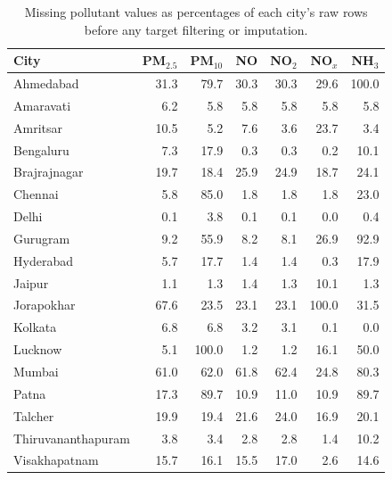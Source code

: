 \begin{table}[!htbp]
\centering
\caption{Missing pollutant values as percentages of each city's raw rows before any target filtering or imputation.}\label{tab:missing0}
\setlength{\tabcolsep}{4pt}
\begin{tabular}{lrrrrrr}
\toprule
City & PM$_{2.5}$ & PM$_{10}$ & NO & NO$_2$ & NO$_x$ & NH$_3$ \\
\midrule
Ahmedabad & 31.3 & 79.7 & 30.3 & 30.3 & 29.6 & 100.0 \\
Amaravati & 6.2 & 5.8 & 5.8 & 5.8 & 5.8 & 5.8 \\
Amritsar & 10.5 & 5.2 & 7.6 & 3.6 & 23.7 & 3.4 \\
Bengaluru & 7.3 & 17.9 & 0.3 & 0.3 & 0.2 & 10.1 \\
Brajrajnagar & 19.7 & 18.4 & 25.9 & 24.9 & 18.7 & 24.1 \\
Chennai & 5.8 & 85.0 & 1.8 & 1.8 & 1.8 & 23.0 \\
Delhi & 0.1 & 3.8 & 0.1 & 0.1 & 0.0 & 0.4 \\
Gurugram & 9.2 & 55.9 & 8.2 & 8.1 & 26.9 & 92.9 \\
Hyderabad & 5.7 & 17.7 & 1.4 & 1.4 & 0.3 & 17.9 \\
Jaipur & 1.1 & 1.3 & 1.4 & 1.3 & 10.1 & 1.3 \\
Jorapokhar & 67.6 & 23.5 & 23.1 & 23.1 & 100.0 & 31.5 \\
Kolkata & 6.8 & 6.8 & 3.2 & 3.1 & 0.1 & 0.0 \\
Lucknow & 5.1 & 100.0 & 1.2 & 1.2 & 16.1 & 50.0 \\
Mumbai & 61.0 & 62.0 & 61.8 & 62.4 & 24.8 & 80.3 \\
Patna & 17.3 & 89.7 & 10.9 & 11.0 & 10.9 & 89.7 \\
Talcher & 19.9 & 19.4 & 21.6 & 24.0 & 16.9 & 20.1 \\
Thiruvananthapuram & 3.8 & 3.4 & 2.8 & 2.8 & 1.4 & 10.2 \\
Visakhapatnam & 15.7 & 16.1 & 15.5 & 17.0 & 2.6 & 14.6 \\
\bottomrule
\end{tabular}
\end{table}
